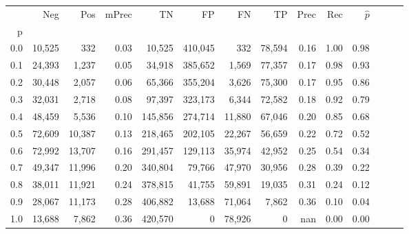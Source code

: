 \begin{tabular}{rrrrrrrrrrrrrr}
\toprule
{} &     Neg &     Pos & mPrec &       TN &       FP &      FN &      TP &  Prec &   Rec & $\hat{p}$ \\
p   &         &         &       &          &          &         &         &       &       &           \\
\midrule
0.0 &  10,525 &     332 &  0.03 &   10,525 &  410,045 &     332 &  78,594 &  0.16 &  1.00 &      0.98 \\
0.1 &  24,393 &   1,237 &  0.05 &   34,918 &  385,652 &   1,569 &  77,357 &  0.17 &  0.98 &      0.93 \\
0.2 &  30,448 &   2,057 &  0.06 &   65,366 &  355,204 &   3,626 &  75,300 &  0.17 &  0.95 &      0.86 \\
0.3 &  32,031 &   2,718 &  0.08 &   97,397 &  323,173 &   6,344 &  72,582 &  0.18 &  0.92 &      0.79 \\
0.4 &  48,459 &   5,536 &  0.10 &  145,856 &  274,714 &  11,880 &  67,046 &  0.20 &  0.85 &      0.68 \\
0.5 &  72,609 &  10,387 &  0.13 &  218,465 &  202,105 &  22,267 &  56,659 &  0.22 &  0.72 &      0.52 \\
0.6 &  72,992 &  13,707 &  0.16 &  291,457 &  129,113 &  35,974 &  42,952 &  0.25 &  0.54 &      0.34 \\
0.7 &  49,347 &  11,996 &  0.20 &  340,804 &   79,766 &  47,970 &  30,956 &  0.28 &  0.39 &      0.22 \\
0.8 &  38,011 &  11,921 &  0.24 &  378,815 &   41,755 &  59,891 &  19,035 &  0.31 &  0.24 &      0.12 \\
0.9 &  28,067 &  11,173 &  0.28 &  406,882 &   13,688 &  71,064 &   7,862 &  0.36 &  0.10 &      0.04 \\
1.0 &  13,688 &   7,862 &  0.36 &  420,570 &        0 &  78,926 &       0 &   nan &  0.00 &      0.00 \\
\bottomrule
\end{tabular}

